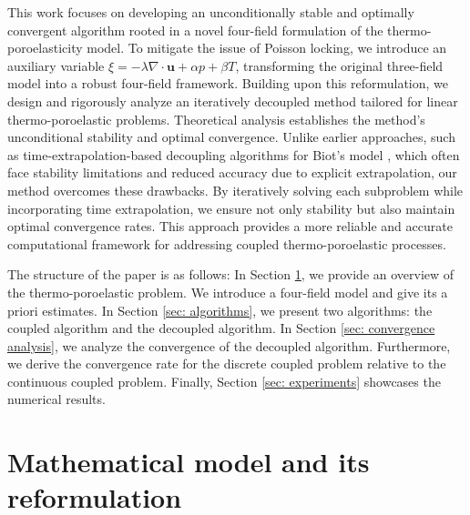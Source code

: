 \documentclass{article}
\numberwithin{equation}{section}
\begin{document}
This work focuses on developing an unconditionally stable and optimally convergent algorithm rooted in a novel four-field formulation of the thermo-poroelasticity model. To mitigate the issue of Poisson locking, we introduce an auxiliary variable \(\xi = -\lambda \nabla \cdot \bm{u} + \alpha p + \beta T\), transforming the original three-field model into a robust four-field framework. Building upon this reformulation, we design and rigorously analyze an iteratively decoupled method tailored for linear thermo-poroelastic problems. Theoretical analysis establishes the method's unconditional stability and optimal convergence. Unlike earlier approaches, such as time-extrapolation-based decoupling algorithms for Biot’s model \cite{ju2020parameter}, which often face stability limitations and reduced accuracy due to explicit extrapolation, our method overcomes these drawbacks. By iteratively solving each subproblem while incorporating time extrapolation, we ensure not only stability but also maintain optimal convergence rates. This approach provides a more reliable and accurate computational framework for addressing coupled thermo-poroelastic processes.

The structure of the paper is as follows:  
In Section \ref{sec: PDE model}, we provide an overview of the thermo-poroelastic problem. We introduce a four-field model and give its a priori estimates. 
In Section \ref{sec: algorithms}, we present two algorithms: the coupled algorithm and the decoupled algorithm.
In Section \ref{sec: convergence analysis}, we analyze the convergence of the decoupled algorithm. Furthermore, we derive the convergence rate for the discrete coupled problem relative to the continuous coupled problem.
Finally, Section \ref{sec: experiments} showcases the numerical results. 

\section{Mathematical model and its reformulation}\label{sec: PDE model}
\end{document}
